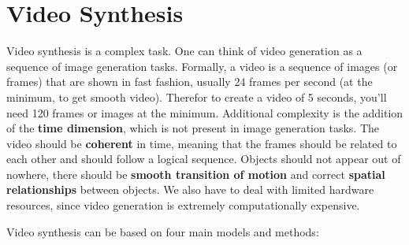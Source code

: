 \section{Video Synthesis}
\label{sec:video_synthesis}

Video synthesis is a complex task. One can think of video generation as a sequence of image generation tasks. Formally, a video is a sequence of images (or frames) that are shown in fast fashion, usually 24 frames per second (at the minimum, to get smooth video). Therefor to create a video of 5 seconds, you'll need 120 frames or images at the minimum. Additional complexity is the addition of the \textbf{time dimension}, which is not present in image generation tasks. The video should be \textbf{coherent} in time, meaning that the frames should be related to each other and should follow a logical sequence. Objects should not appear out of nowhere, there should be \textbf{smooth transition of motion} and correct \textbf{spatial relationships} between objects. We also have to deal with limited hardware resources, since video generation is extremely computationally expensive.

% 



Video synthesis can be based on four main models and methods:


